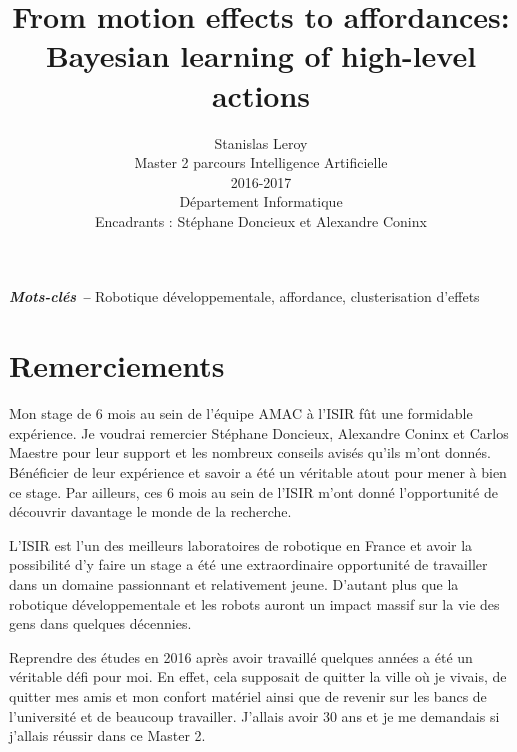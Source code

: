 \documentclass{llncs}
\providecommand{\keywords}[1]{\textbf{\textit{Mots-clés --}} #1}
\begin{document}
\title{From motion effects to affordances: Bayesian learning of high-level actions}

\author{Stanislas Leroy\\
   Master 2 parcours Intelligence Artificielle\\
   2016-2017\\
   Département Informatique\\
   Encadrants : Stéphane Doncieux et Alexandre Coninx}

\maketitle

\keywords{Robotique développementale, affordance, clusterisation d'effets}


\section*{Remerciements}

Mon stage de 6 mois au sein de l'équipe AMAC à l'ISIR fût une formidable expérience. Je voudrai remercier Stéphane Doncieux, Alexandre Coninx et Carlos Maestre pour leur support et les nombreux conseils avisés qu'ils m'ont donnés.
Bénéficier de leur expérience et savoir a été un véritable atout pour mener à bien ce stage. Par ailleurs, ces 6 mois au sein de l'ISIR m'ont donné l'opportunité de découvrir davantage le monde de la recherche.

L'ISIR est l'un des meilleurs laboratoires de robotique en France et avoir la possibilité d'y faire un stage a été une extraordinaire opportunité de travailler dans un domaine passionnant et relativement jeune. D'autant plus que la robotique développementale et les robots auront un impact massif sur la vie des gens dans quelques décennies.

Reprendre des études en 2016 après avoir travaillé quelques années a été un véritable défi pour moi. En effet, cela supposait de quitter la ville où je vivais, de quitter mes amis et mon confort matériel ainsi que de revenir sur les bancs de l'université et de beaucoup travailler. J'allais avoir 30 ans et je me demandais si j'allais réussir dans ce Master 2.
\end{document}
